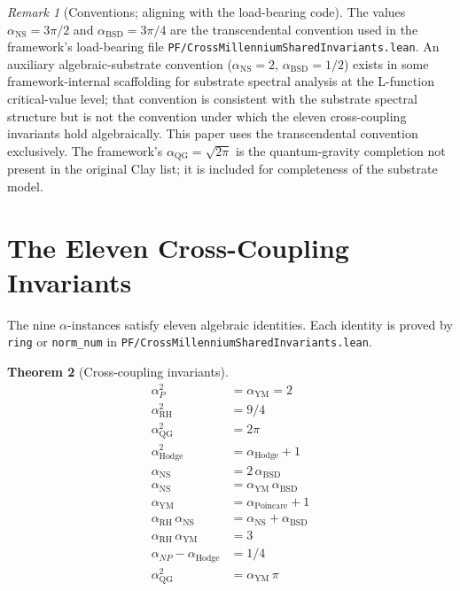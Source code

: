 \documentclass[11pt,a4paper]{article}
\theoremstyle{plain}
\newtheorem{theorem}{Theorem}[section]
\theoremstyle{definition}
\theoremstyle{remark}
\newtheorem{remark}[theorem]{Remark}
\newcommand{\aPo}{\alpha_{\mathrm{Poincare}}}
\newcommand{\aP}{\alpha_{P}}
\newcommand{\aNP}{\alpha_{NP}}
\newcommand{\aRH}{\alpha_{\mathrm{RH}}}
\newcommand{\aYM}{\alpha_{\mathrm{YM}}}
\newcommand{\aNS}{\alpha_{\mathrm{NS}}}
\newcommand{\aBSD}{\alpha_{\mathrm{BSD}}}
\newcommand{\aHodge}{\alpha_{\mathrm{Hodge}}}
\newcommand{\aQG}{\alpha_{\mathrm{QG}}}
\newcommand{\code}[1]{\texttt{#1}}
\begin{document}
\begin{remark}[Conventions; aligning with the load-bearing code]
\label{rem:conventions}
The values $\aNS = 3\pi/2$ and $\aBSD = 3\pi/4$ are the
transcendental convention used in the framework's load-bearing
file \code{PF/CrossMillenniumSharedInvariants.lean}. An auxiliary
algebraic-substrate convention ($\aNS = 2$, $\aBSD = 1/2$)
exists in some framework-internal scaffolding for substrate
spectral analysis at the L-function critical-value level; that
convention is consistent with the substrate spectral structure
but is not the convention under which the eleven cross-coupling
invariants hold algebraically. This paper uses the transcendental
convention exclusively. The framework's $\aQG = \sqrt{2\pi}$ is
the quantum-gravity completion not present in the original Clay
list; it is included for completeness of the substrate model.
\end{remark}

\section{The Eleven Cross-Coupling Invariants}
\label{sec:invariants}

The nine $\alpha$-instances satisfy eleven algebraic identities.
Each identity is proved by \code{ring} or \code{norm\_num} in
\code{PF/CrossMillenniumSharedInvariants.lean}.

\begin{theorem}[Cross-coupling invariants]
\label{thm:invariants}
\begin{align}
\aP^{2}             &= \aYM = 2 \label{eq:i1}\\
\aRH^{2}            &= 9/4 \label{eq:i2}\\
\aQG^{2}            &= 2\pi \label{eq:i3}\\
\aHodge^{2}         &= \aHodge + 1 \label{eq:i4}\\
\aNS                &= 2 \, \aBSD \label{eq:i5}\\
\aNS                &= \aYM \, \aBSD \label{eq:i6}\\
\aYM                &= \aPo + 1 \label{eq:i7}\\
\aRH \, \aNS        &= \aNS + \aBSD \label{eq:i8}\\
\aRH \, \aYM        &= 3 \label{eq:i9}\\
\aNP - \aHodge      &= 1/4 \label{eq:i10}\\
\aQG^{2}            &= \aYM \, \pi \label{eq:i11}
\end{align}
\end{theorem}
\end{document}
